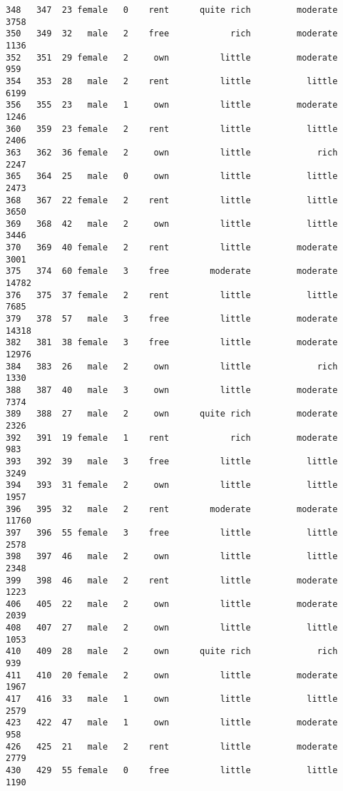 \documentclass[
]{article}
\begin{document}
\begin{verbatim}
348   347  23 female   0    rent      quite rich         moderate          3758
350   349  32   male   2    free            rich         moderate          1136
352   351  29 female   2     own          little         moderate           959
354   353  28   male   2    rent          little           little          6199
356   355  23   male   1     own          little         moderate          1246
360   359  23 female   2    rent          little           little          2406
363   362  36 female   2     own          little             rich          2247
365   364  25   male   0     own          little           little          2473
368   367  22 female   2    rent          little           little          3650
369   368  42   male   2     own          little           little          3446
370   369  40 female   2    rent          little         moderate          3001
375   374  60 female   3    free        moderate         moderate         14782
376   375  37 female   2    rent          little           little          7685
379   378  57   male   3    free          little         moderate         14318
382   381  38 female   3    free          little         moderate         12976
384   383  26   male   2     own          little             rich          1330
388   387  40   male   3     own          little         moderate          7374
389   388  27   male   2     own      quite rich         moderate          2326
392   391  19 female   1    rent            rich         moderate           983
393   392  39   male   3    free          little           little          3249
394   393  31 female   2     own          little           little          1957
396   395  32   male   2    rent        moderate         moderate         11760
397   396  55 female   3    free          little           little          2578
398   397  46   male   2     own          little           little          2348
399   398  46   male   2    rent          little         moderate          1223
406   405  22   male   2     own          little         moderate          2039
408   407  27   male   2     own          little           little          1053
410   409  28   male   2     own      quite rich             rich           939
411   410  20 female   2     own          little         moderate          1967
417   416  33   male   1     own          little           little          2579
423   422  47   male   1     own          little         moderate           958
426   425  21   male   2    rent          little         moderate          2779
430   429  55 female   0    free          little           little          1190

\end{verbatim}
\end{document}
